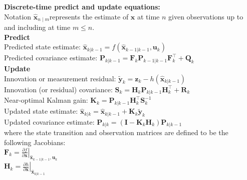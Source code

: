 \textbf{Discrete-time predict and update equations:}\\
Notation  ${\displaystyle {\hat {\mathbf {x} }}_{n\mid m}} $represents the estimate of ${\displaystyle \mathbf {x} }$ at time $n$ given observations up to and including at time $m \leq n$. \\
\textbf{Predict}\\
Predicted state estimate:  	 ${\displaystyle {\hat {\boldsymbol {x}}}_{k|k-1}=f({\hat {\boldsymbol {x}}}_{k-1|k-1},{\boldsymbol {u}}_{k})}$ \\
Predicted covariance estimate: ${\displaystyle {\boldsymbol {P}}_{k|k-1}={{\boldsymbol {F}}_{k}}{\boldsymbol {P}}_{k-1|k-1}{{\boldsymbol {F}}_{k}^{\top }}+{\boldsymbol {Q}}_{k}}$ \\
\textbf{Update}\\
Innovation or measurement residual: ${\displaystyle {\tilde {\boldsymbol {y}}}_{k}={\boldsymbol {z}}_{k}-h({\hat {\boldsymbol {x}}}_{k|k-1})}$ \\
Innovation (or residual) covariance: ${\displaystyle {\boldsymbol {S}}_{k}={{\boldsymbol {H}}_{k}}{\boldsymbol {P}}_{k|k-1}{{\boldsymbol {H}}_{k}^{\top }}+{\boldsymbol {R}}_{k}} $ \\
Near-optimal Kalman gain: $ {\displaystyle {\boldsymbol {K}}_{k}={\boldsymbol {P}}_{k|k-1}{{\boldsymbol {H}}_{k}^{\top }}{\boldsymbol {S}}_{k}^{-1}}$ \\ 
Updated state estimate: ${\displaystyle {\hat {\boldsymbol {x}}}_{k|k}={\hat {\boldsymbol {x}}}_{k|k-1}+{\boldsymbol {K}}_{k}{\tilde {\boldsymbol {y}}}_{k}} $ \\
Updated covariance estimate: $ {\displaystyle {\boldsymbol {P}}_{k|k}=({\boldsymbol {I}}-{\boldsymbol {K}}_{k}{{\boldsymbol {H}}_{k}}){\boldsymbol {P}}_{k|k-1}} $\\
where the state transition and observation matrices are defined to be the following Jacobians: \\
  
  $ {\displaystyle {{\boldsymbol {F}}_{k}}=\left.{\frac {\partial f}{\partial {\boldsymbol {x}}}}\right\vert _{{\hat {\boldsymbol {x}}}_{k-1|k-1},{\boldsymbol {u}}_{k}}}$ \\ 
 ${\displaystyle {{\boldsymbol {H}}_{k}}=\left.{\frac {\partial h}{\partial {\boldsymbol {x}}}}\right\vert _{{\hat {\boldsymbol {x}}}_{k|k-1}}}$ 
